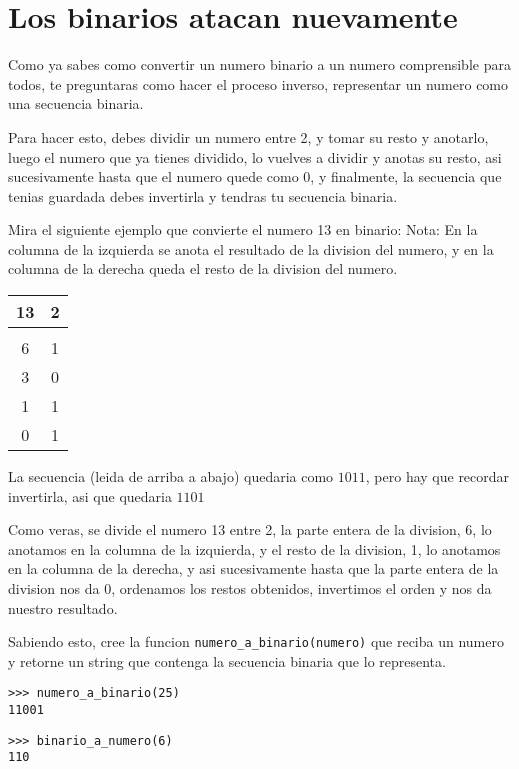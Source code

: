 
\section{Los binarios atacan nuevamente}

Como ya sabes como convertir un numero binario a un numero comprensible para todos, te preguntaras como hacer el proceso inverso, representar un numero como una secuencia binaria.

Para hacer esto, debes dividir un numero entre 2, y tomar su resto y anotarlo, luego el numero que ya tienes dividido, lo vuelves a dividir y anotas su resto, asi sucesivamente hasta que el numero quede como 0, y finalmente, la secuencia que tenias guardada debes invertirla y tendras tu secuencia binaria.

Mira el siguiente ejemplo que convierte el numero 13 en binario:
Nota: En la columna de la izquierda se anota el resultado de la division del numero, y en la columna de la derecha queda el resto de la division del numero.
\begin{center}
    \begin{tabular}{|c|c|}
        \hline
        \textbf{13} & \textbf{2} \\
        \hline
         & \\
        \hline
        6 & 1 \\
        \hline
        3 & 0 \\
        \hline
        1 & 1 \\
        \hline
        0 & 1 \\
        \hline
    \end{tabular}
\end{center}
\begin{center}
    La secuencia (leida de arriba a abajo) quedaria como $1011$, pero hay que recordar invertirla, asi que quedaria $1101$
\end{center}

Como veras, se divide el numero 13 entre 2, la parte entera de la division, 6, lo anotamos en la columna de la izquierda, y el resto de la division, 1, lo anotamos en la columna de la derecha, y asi sucesivamente hasta que la parte entera de la division nos da 0, ordenamos los restos obtenidos, invertimos el orden y nos da nuestro resultado.

Sabiendo esto, cree la funcion \texttt{numero\_a\_binario(numero)} que reciba un numero y retorne un string que contenga la secuencia binaria que lo representa.

\begin{lstlisting}[style=consola]
>>> numero_a_binario(25)
11001
\end{lstlisting}

\begin{lstlisting}[style=consola]
>>> binario_a_numero(6)
110
\end{lstlisting}
